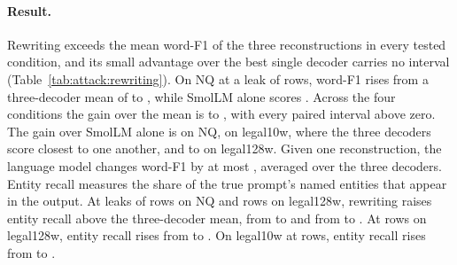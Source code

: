\paragraph{Result.} Rewriting exceeds the mean word-F1 of the three reconstructions in every tested condition, and its small advantage over the best single decoder carries no interval (Table~\ref{tab:attack:rewriting}).
On NQ at a leak of  rows, word-F1 rises from a three-decoder mean of  to , while SmolLM alone scores . %
Across the four conditions the gain over the mean is  to , with every paired interval above zero.
The gain over SmolLM alone is  on NQ,  on legal10w, where the three decoders score closest to one another, and  to  on legal128w. %
Given one reconstruction, the language model changes word-F1 by at most , averaged over the three decoders. %
Entity recall measures the share of the true prompt's named entities that appear in the output.
At leaks of  rows on NQ and  rows on legal128w, rewriting raises entity recall above the three-decoder mean, from  to  and from  to . %
At  rows on legal128w, entity recall rises from  to .
On legal10w at  rows, entity recall rises from  to . %

